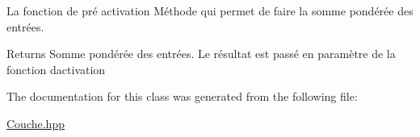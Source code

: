 La fonction de pré activation Méthode qui permet de faire la somme pondérée des entrées. 

\begin{DoxyReturn}{Returns}
Somme pondérée des entrées. Le résultat est passé en paramètre de la fonction d\textquotesingle{}activation 
\end{DoxyReturn}


The documentation for this class was generated from the following file\+:\begin{DoxyCompactItemize}
\item 
\hyperlink{_couche_8hpp}{Couche.\+hpp}\end{DoxyCompactItemize}
